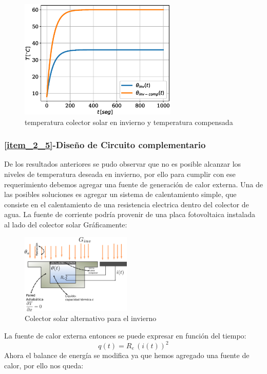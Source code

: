 \begin{figure}[H]
   \centering
   \includegraphics[width=0.67\textwidth]{Images/colector_esquema_invierno_comp.eps}
   \caption{temperatura colector solar en invierno y temperatura compensada}\label{fig:colector_temperatura_invierno_comp}
\end{figure}

\subsubsection{\ref{item_2_5}-Diseño de Circuito complementario}
De los resultados anteriores se pudo observar que no es posible alcanzar los niveles de temperatura
deseada en invierno, por ello para cumplir con ese requerimiento debemos agregar una fuente de generación de
calor externa. Una de las posibles soluciones es agregar un sistema de calentamiento simple, que
consiste en el calentamiento de una resistencia electrica dentro del colector de agua. La fuente
de corriente podría provenir de una placa fotovoltaica instalada al lado del colector solar
Gráficamente:

\begin{figure}[H]
   \centering
   \includegraphics[width=0.47\textwidth]{Images/colector_esquema_invierno.eps}
   \caption{Colector solar alternativo para el invierno}\label{fig:colector_esquema_invierno}
\end{figure}
La fuente de calor externa entonces se puede expresar en función del tiempo:
\begin{equation}
   q(t) = R_{e}\,\left(i(t)\right)^{2}
\end{equation}
Ahora el balance de energía se modifica ya que hemos agregado una fuente de calor, por ello nos queda:

